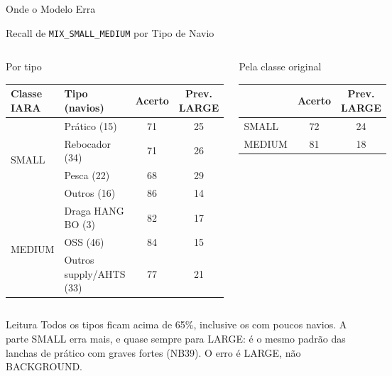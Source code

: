 \documentclass[aspectratio=169]{beamer}
\newcommand{\camd}[1]{\cellcolor{yellow!35}#1}
\newcommand{\mix}{\texttt{MIX\_SMALL\_MEDIUM}}
\begin{document}
\begin{frame}
    \centering
    \huge Onde o Modelo Erra
\end{frame}

\begin{frame}{Recall de \mix{} por Tipo de Navio}
    \footnotesize
    \begin{columns}[t]
        \begin{block}{\small Por tipo}
            \scriptsize
            \centering
            \setlength{\tabcolsep}{3pt}
            \begin{tabular}{llcc}
            \toprule
            Classe IARA & Tipo (navios) & Acerto & Prev. LARGE \\
            \midrule
            \multirow{4}{*}{SMALL} & Prático (15) & 71 & 25 \\
             & Rebocador (34) & 71 & 26 \\
             & Pesca (22) & \camd{68} & 29 \\
             & Outros (16) & 86 & 14 \\
            \midrule
            \multirow{3}{*}{MEDIUM} & Draga HANG BO (3) & 82 & 17 \\
             & OSS (46) & 84 & 15 \\
             & Outros supply/AHTS (33) & 77 & 21 \\
            \bottomrule
            \end{tabular}
        \end{block}
        \begin{block}{\small Pela classe original}
            \scriptsize
            \centering
            \begin{tabular}{lcc}
            \toprule
             & Acerto & Prev. LARGE \\
            \midrule
            SMALL & 72 & 24 \\
            MEDIUM & 81 & 18 \\
            \bottomrule
            \end{tabular}
        \end{block}
    \end{columns}
    \vspace{0.1cm}
    \begin{alertblock}{Leitura}
        \scriptsize
        Todos os tipos ficam acima de 65\%, inclusive os com poucos navios. A parte SMALL erra mais, e quase sempre para LARGE: é o mesmo padrão das lanchas de prático com graves fortes (NB39). O erro é LARGE, não BACKGROUND.
    \end{alertblock}
\end{frame}
\end{document}
